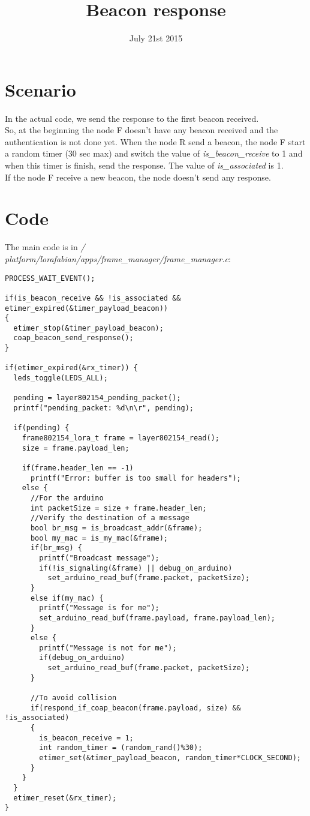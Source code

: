 \documentclass{article}
\title{Beacon response}
\date{July 21st 2015}
\begin{document}
\maketitle

\tableofcontents

\section{Scenario}
In the actual code, we send the response to the first beacon received.\\
So, at the beginning the node F doesn't have any beacon received and the authentication is not done yet. When the node R send a beacon, the node F start a random timer (30 sec max) and switch the value of \emph{is\_beacon\_receive} to 1 and when this timer is finish, send the response. The value of \emph{is\_associated} is 1.\\
If the node F receive a new beacon, the node doesn't send any response.
\section{Code}
The main code is in \emph{/ platform/lorafabian/apps/frame\_manager/frame\_manager.c}:
\begin{verbatim}
PROCESS_WAIT_EVENT();

if(is_beacon_receive && !is_associated && etimer_expired(&timer_payload_beacon))
{
  etimer_stop(&timer_payload_beacon);
  coap_beacon_send_response();
}

if(etimer_expired(&rx_timer)) {
  leds_toggle(LEDS_ALL);

  pending = layer802154_pending_packet();
  printf("pending_packet: %d\n\r", pending);

  if(pending) {
    frame802154_lora_t frame = layer802154_read();
    size = frame.payload_len;

    if(frame.header_len == -1)
      printf("Error: buffer is too small for headers");
    else {
      //For the arduino
      int packetSize = size + frame.header_len;
      //Verify the destination of a message
      bool br_msg = is_broadcast_addr(&frame);
      bool my_mac = is_my_mac(&frame);
      if(br_msg) {
        printf("Broadcast message");
        if(!is_signaling(&frame) || debug_on_arduino)
          set_arduino_read_buf(frame.packet, packetSize);
      }
      else if(my_mac) {
        printf("Message is for me");
        set_arduino_read_buf(frame.payload, frame.payload_len);
      }
      else {
        printf("Message is not for me");
        if(debug_on_arduino)
          set_arduino_read_buf(frame.packet, packetSize);
      }

      //To avoid collision
      if(respond_if_coap_beacon(frame.payload, size) && !is_associated)
      {
        is_beacon_receive = 1;
        int random_timer = (random_rand()%30);
        etimer_set(&timer_payload_beacon, random_timer*CLOCK_SECOND);
      }
    }
  }
  etimer_reset(&rx_timer);
}
\end{verbatim}
\end{document}
